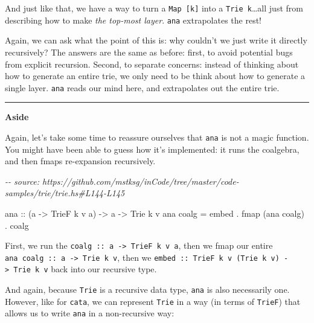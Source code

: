 \documentclass[]{article}
\newenvironment{Shaded}{}{}
\newcommand{\CommentTok}[1]{\textcolor[rgb]{0.38,0.63,0.69}{\textit{#1}}}
\newcommand{\DataTypeTok}[1]{\textcolor[rgb]{0.56,0.13,0.00}{#1}}
\newcommand{\FunctionTok}[1]{\textcolor[rgb]{0.02,0.16,0.49}{#1}}
\newcommand{\NormalTok}[1]{#1}
\newcommand{\OperatorTok}[1]{\textcolor[rgb]{0.40,0.40,0.40}{#1}}
\newcommand{\OtherTok}[1]{\textcolor[rgb]{0.00,0.44,0.13}{#1}}
\begin{document}
And just like that, we have a way to turn a \texttt{Map\ {[}k{]}} into a
\texttt{Trie\ k}\ldots all just from describing how to make \emph{the top-most
layer}. \texttt{ana} extrapolates the rest!

Again, we can ask what the point of this is: why couldn't we just write it
directly recursively? The answers are the same as before: first, to avoid
potential bugs from explicit recursion. Second, to separate concerns: instead of
thinking about how to generate an entire trie, we only need to be think about
how to generate a single layer. \texttt{ana} reads our mind here, and
extrapolates out the entire trie.

\begin{center}\rule{0.5\linewidth}{0.5pt}\end{center}

\textbf{Aside}

Again, let's take some time to reassure ourselves that \texttt{ana} is not a
magic function. You might have been able to guess how it's implemented: it runs
the coalgebra, and then fmaps re-expansion recursively.

\begin{Shaded}
\begin{Highlighting}[]
\CommentTok{{-}{-} source: https://github.com/mstksg/inCode/tree/master/code{-}samples/trie/trie.hs\#L144{-}L145}

\OtherTok{ana\textquotesingle{} ::}\NormalTok{ (a }\OtherTok{{-}\textgreater{}} \DataTypeTok{TrieF}\NormalTok{ k v a) }\OtherTok{{-}\textgreater{}}\NormalTok{ a }\OtherTok{{-}\textgreater{}} \DataTypeTok{Trie}\NormalTok{ k v}
\NormalTok{ana\textquotesingle{} coalg }\OtherTok{=}\NormalTok{ embed }\OperatorTok{.} \FunctionTok{fmap}\NormalTok{ (ana\textquotesingle{} coalg) }\OperatorTok{.}\NormalTok{ coalg}
\end{Highlighting}
\end{Shaded}

First, we run the \texttt{coalg\ ::\ a\ -\textgreater{}\ TrieF\ k\ v\ a}, then
we fmap our entire \texttt{ana\ coalg\ ::\ a\ -\textgreater{}\ Trie\ k\ v}, then
we \texttt{embed\ ::\ TrieF\ k\ v\ (Trie\ k\ v)\ -\textgreater{}\ Trie\ k\ v}
back into our recursive type.

And again, because \texttt{Trie} is a recursive data type, \texttt{ana} is also
necessarily one. However, like for \texttt{cata}, we can represent \texttt{Trie}
in a way (in terms of \texttt{TrieF}) that allows us to write \texttt{ana} in a
non-recursive way:
\end{document}
